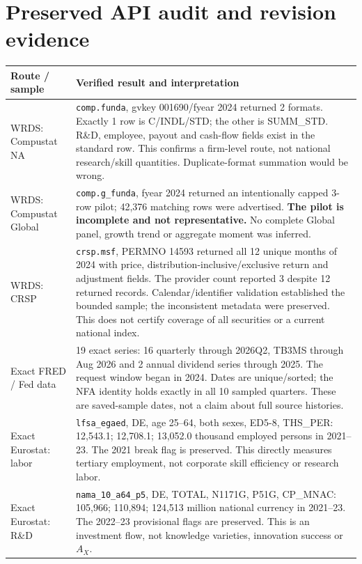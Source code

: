 \documentclass[10pt,a4paper,landscape]{article}
\newcommand{\code}[1]{{\footnotesize\texttt{#1}}}
\begin{document}
\section{Preserved API audit and revision evidence}
\begin{longtable}{@{}P{.22\textwidth}P{.72\textwidth}@{}}
\toprule{}\textbf{Route / sample} & \textbf{Verified result and interpretation}\\\midrule
WRDS: Compustat NA & \code{comp.funda}, gvkey 001690/fyear 2024 returned 2 formats. Exactly 1 row is C/INDL/STD; the other is SUMM\_STD. R\&D, employee, payout and cash-flow fields exist in the standard row. This confirms a firm-level route, not national research/skill quantities. Duplicate-format summation would be wrong.\\[6pt]
WRDS: Compustat Global & \code{comp.g\_funda}, fyear 2024 returned an intentionally capped 3-row pilot; 42,376 matching rows were advertised. \textbf{The pilot is incomplete and not representative.} No complete Global panel, growth trend or aggregate moment was inferred.\\[6pt]
WRDS: CRSP & \code{crsp.msf}, PERMNO 14593 returned all 12 unique months of 2024 with price, distribution-inclusive/exclusive return and adjustment fields. The provider count reported 3 despite 12 returned records. Calendar/identifier validation established the bounded sample; the inconsistent metadata were preserved. This does not certify coverage of all securities or a current national index.\\[6pt]
Exact FRED / Fed data & 19 exact series: 16 quarterly through 2026Q2, TB3MS through Aug 2026 and 2 annual dividend series through 2025. The request window began in 2024. Dates are unique/sorted; the NFA identity holds exactly in all 10 sampled quarters. These are saved-sample dates, not a claim about full source histories.\\[6pt]
Exact Eurostat: labor & \code{lfsa\_egaed}, DE, age 25--64, both sexes, ED5-8, THS\_PER: 12,543.1; 12,708.1; 13,052.0 thousand employed persons in 2021--23. The 2021 break flag is preserved. This directly measures tertiary employment, not corporate skill efficiency or research labor.\\[6pt]
Exact Eurostat: R\&D & \code{nama\_10\_a64\_p5}, DE, TOTAL, N1171G, P51G, CP\_MNAC: 105,966; 110,894; 124,513 million national currency in 2021--23. The 2022--23 provisional flags are preserved. This is an investment flow, not knowledge varieties, innovation success or $A_X$.\\[6pt]

\end{longtable}
\end{document}
